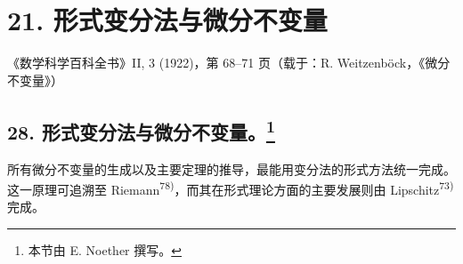 \documentclass[11pt]{article}
\begin{document}
\setcounter{footnote}{0}

\section*{21. 形式变分法与微分不变量}
\begin{center}
《数学科学百科全书》II, 3 (1922)，第 68--71 页（载于：R. Weitzenböck，《微分不变量》）
\end{center}

\begingroup
\renewcommand{\thefootnote}{\arabic{footnote})}
\setcounter{footnote}{148}
\subsection*{28. 形式变分法与微分不变量。\footnote{本节由 E. Noether 撰写。}}

所有微分不变量的生成以及主要定理的推导，最能用变分法的形式方法统一完成。这一原理可追溯至 Riemann\textsuperscript{78)}，而其在形式理论方面的主要发展则由 Lipschitz\textsuperscript{73)} 完成。
\end{document}
